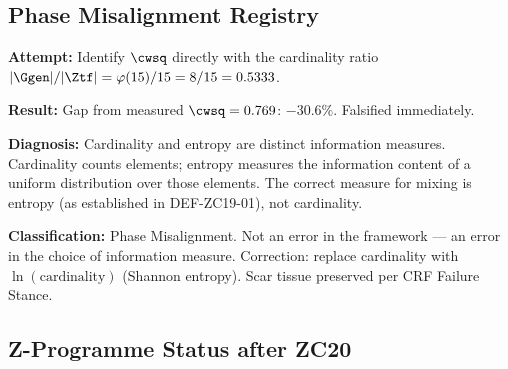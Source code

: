 \documentclass[12pt, a4paper]{article}
\begin{document}
\subsection{Phase Misalignment Registry}
\label{zc20:sec:pm}

\begin{formalbox}[title={PM-ZC20-01: Abandoned Cardinality Route}]
\textbf{Attempt:} Identify $\cwsq$ directly with the cardinality ratio
$|\Ggen|/|\Ztf| = \varphi(15)/15 = 8/15 = 0.5333$.

\textbf{Result:} Gap from measured $\cwsq = 0.769$: $-30.6\%$.
Falsified immediately.

\textbf{Diagnosis:} Cardinality and entropy are distinct
information measures. Cardinality counts elements; entropy measures
the information content of a uniform distribution over those
elements. The correct measure for mixing is entropy (as established
in DEF-ZC19-01), not cardinality.

\textbf{Classification:} Phase Misalignment.
Not an error in the framework --- an error in the choice of
information measure. Correction: replace cardinality with
$\ln(\text{cardinality})$ (Shannon entropy).
Scar tissue preserved per CRF Failure Stance.
\end{formalbox}

\subsection{Z-Programme Status after ZC20}
\label{zc20:sec:status}
\end{document}
